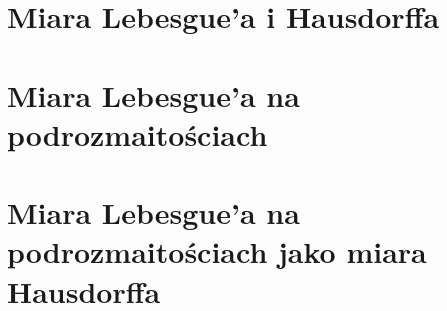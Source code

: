 \chapter{Miara Lebesgue'a i Hausdorffa}


\chapter{Miara Lebesgue'a na podrozmaitościach}


\chapter{Miara Lebesgue'a na podrozmaitościach jako miara Hausdorffa}
